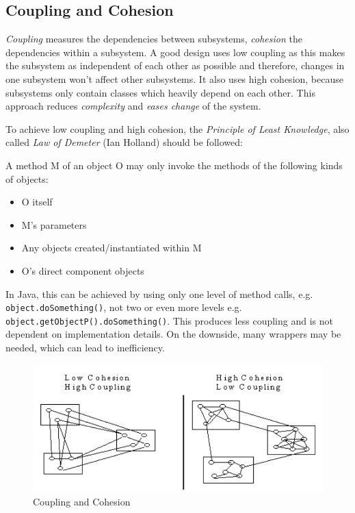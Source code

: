 

\subsection{Coupling and Cohesion}
\textit{Coupling} measures the dependencies between subsystems, \textit{cohesion} the dependencies within a subsystem.
A good design uses low coupling as this makes the subsystem as independent of each other as possible and therefore, changes in one subsystem won't affect other subsystems.
It also uses high cohesion, because subsystems only contain classes which heavily depend on each other.
This approach reduces \textit{complexity} and \textit{eases change} of the system.

To achieve low coupling and high cohesion, the \textit{Principle of Least Knowledge}, also called \textit{Law of Demeter} (Ian Holland) should be followed:

A method M of an object O may only invoke the methods of the following kinds of objects:
\begin{itemize}
	\item O itself
	\item M's parameters
	\item Any objects created/instantiated within M
	\item O's direct component objects
\end{itemize}

In Java, this can be achieved by using only one level of method calls, e.g. \texttt{object.doSomething()}, not two or even more levels e.g. \texttt{object.getObjectP().doSomething()}.
This produces less coupling and is not dependent on implementation details. On the downside, many wrappers may be needed, which can lead to inefficiency.

\begin{figure}[h!]
	\centering
	\includegraphics[width=\linewidth]{images/oop_coupling_cohesion}
	\caption{Coupling and Cohesion}
\end{figure}


